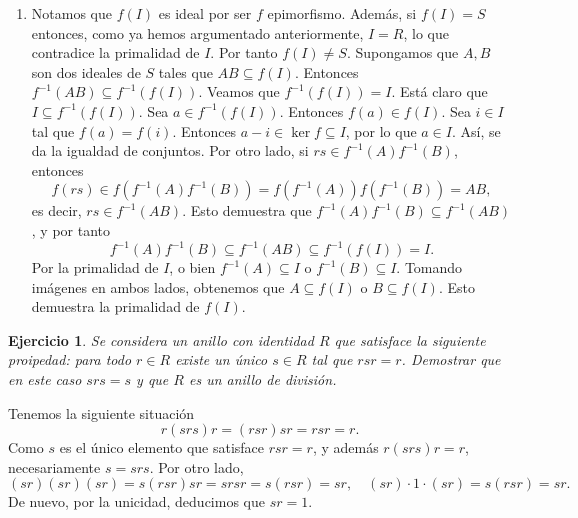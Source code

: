 \documentclass[11pt]{book}
\newtheorem{ej}{Ejercicio}
\theoremstyle{definition}
\begin{document}
\begin{enumerate}
    \item Notamos que $f(I)$ es ideal por ser $f$ epimorfismo. Además, si $f(I)=S$ entonces, como ya hemos argumentado anteriormente, $I=R$, lo que contradice la primalidad de $I$. Por tanto $f(I)\neq S$. Supongamos que $A,B$ son dos ideales de $S$ tales que $AB\subseteq f(I)$. Entonces $f^{-1}(AB)\subseteq f^{-1}(f(I))$. Veamos que $f^{-1}(f(I))=I$. Está claro que $I\subseteq f^{-1}(f(I))$. Sea $a\in f^{-1}(f(I))$. Entonces $f(a)\in f(I)$. Sea $i\in I$ tal que $f(a)=f(i)$. Entonces $a-i\in\ker f\subseteq I$, por lo que $a\in I$. Así, se da la igualdad de conjuntos. Por otro lado, si $rs\in f^{-1}(A)f^{-1}(B)$, entonces \[
    f(rs)\in f(f^{-1}(A)f^{-1}(B))=f(f^{-1}(A))f(f^{-1}(B))=AB,
    \]es decir, $rs\in f^{-1}(AB)$. Esto demuestra que $f^{-1}(A)f^{-1}(B)\subseteq f^{-1}(AB)$, y por tanto\[
        f^{-1}(A)f^{-1}(B)\subseteq f^{-1}(AB)\subseteq f^{-1}(f(I))=I.
    \]Por la primalidad de $I$, o bien $f^{-1}(A)\subseteq I$ o $f^{-1}(B)\subseteq I$. Tomando imágenes en ambos lados, obtenemos que $A\subseteq f(I)$ o $B\subseteq f(I)$. Esto demuestra la primalidad de $f(I)$.
\end{enumerate}

\begin{ej}
    Se considera un anillo con identidad $R$ que satisface la siguiente proipedad: para todo $r\in R$ existe un único $s\in R$ tal que $rsr=r$. Demostrar que en este caso $srs=s$ y que $R$ es un anillo de división.
\end{ej}
\noindent Tenemos la siguiente situación \[
r(srs)r=(rsr)sr=rsr=r.\]
Como $s$ es el único elemento que satisface $rsr=r$, y además $r(srs)r=r$, necesariamente $s=srs$. Por otro lado,\[
(sr)(sr)(sr)=s(rsr)sr=srsr=s(rsr)=sr, \quad (sr)\cdot 1\cdot (sr)=s(rsr)=sr.
\]De nuevo, por la unicidad, deducimos que $sr=1$.
\end{document}
